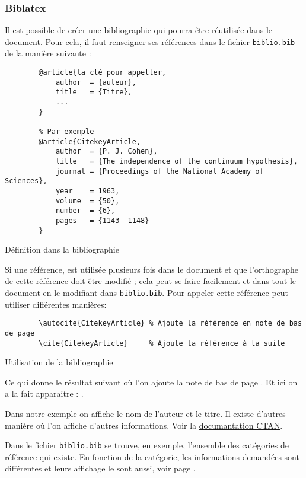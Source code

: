 \subsubsection{Biblatex}
Il est possible de créer une bibliographie qui pourra être réutilisée dans le document.
Pour cela, il faut renseigner ses références dans le fichier \verb=biblio.bib= de la manière suivante :
\begin{code}
    \begin{verbatim}
        @article{la clé pour appeller,
            author  = {auteur},
            title   = {Titre},
            ...
        }

        % Par exemple
        @article{CitekeyArticle,
            author  = {P. J. Cohen},
            title   = {The independence of the continuum hypothesis},
            journal = {Proceedings of the National Academy of Sciences},
            year    = 1963,
            volume  = {50},
            number  = {6},
            pages   = {1143--1148}
        }
\end{verbatim}
    \caption{Définition dans la bibliographie}
\end{code}

Si une référence, est utilisée plusieurs fois dans le document et que l’orthographe de cette référence
doit être modifié ; cela peut se faire facilement et dans tout le document en le modifiant dans
\verb=biblio.bib=.
Pour appeler cette référence peut utiliser différentes manières:
\begin{code}
    \begin{verbatim}
        \autocite{CitekeyArticle} % Ajoute la référence en note de bas de page
        \cite{CitekeyArticle}     % Ajoute la référence à la suite
\end{verbatim}
    \caption{Utilisation de la bibliographie}
\end{code}

Ce qui donne le résultat suivant où l'on ajoute la note de bas de page \autocite{CitekeyArticle}.
Et ici on a la fait apparaitre : \cite{CitekeyArticle}. \newline

Dans notre exemple on affiche le nom de l'auteur et le titre. Il existe d'autres manière où l'on affiche d'autres informations.
Voir la \href{https://mirror.ibcp.fr/pub/CTAN/macros/latex/contrib/biblatex/doc/biblatex.pdf#subsection.3.9}{documantation CTAN}. \newline

Dans le fichier \verb=biblio.bib= se trouve, en exemple, l'ensemble des catégories de référence qui existe.
En fonction de la catégorie, les informations demandées sont différentes et leurs affichage le sont aussi,
voir page \pageref{bibliographie}.